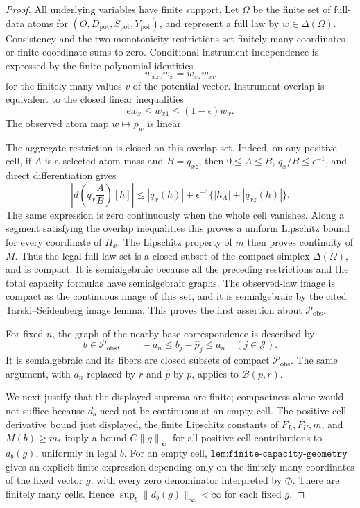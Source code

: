\documentclass{article}
\begin{document}
\begin{proof}
All underlying variables have finite support.  Let \(\Omega\) be the finite set of full-data atoms for \((O,D_{\mathrm{pot}},S_{\mathrm{pot}},Y_{\mathrm{pot}})\), and represent a full law by \(w\in\Delta(\Omega)\).  Consistency and the two monotonicity restrictions set finitely many coordinates or finite coordinate sums to zero.  Conditional instrument independence is expressed by the finite polynomial identities
\[
w_{xzv}w_x=w_{xz}w_{xv}
\]
for the finitely many values \(v\) of the potential vector.  Instrument overlap is equivalent to the closed linear inequalities
\[
\epsilon w_x\le w_{x1}\le(1-\epsilon)w_x.
\]
The observed atom map \(w\mapsto p_w\) is linear.

The aggregate restriction is closed on this overlap set.  Indeed, on any positive cell, if \(A\) is a selected atom mass and \(B=q_{xz}\), then \(0\le A\le B\), \(q_x/B\le\epsilon^{-1}\), and direct differentiation gives
\[
\left|d\left(q_x\frac{A}{B}\right)[h]\right|
\le |q_x(h)|+\epsilon^{-1}\{|h_A|+|q_{xz}(h)|\}.
\]
The same expression is zero continuously when the whole cell vanishes.  Along a segment satisfying the overlap inequalities this proves a uniform Lipschitz bound for every coordinate of \(H_x\).  The Lipschitz property of \(m\) then proves continuity of \(M\).  Thus the legal full-law set is a closed subset of the compact simplex \(\Delta(\Omega)\), and is compact.  It is semialgebraic because all the preceding restrictions and the total capacity formulas have semialgebraic graphs.  The observed-law image is compact as the continuous image of this set, and it is semialgebraic by the cited Tarski--Seidenberg image lemma.  This proves the first assertion about \(\mathcal P_{\mathrm{obs}}\).

For fixed \(n\), the graph of the nearby-base correspondence is described by
\[
b\in\mathcal P_{\mathrm{obs}},\qquad -a_n\le b_j-\widehat p_j\le a_n
\quad(j\in\mathcal J).
\]
It is semialgebraic and its fibers are closed subsets of compact \(\mathcal P_{\mathrm{obs}}\).  The same argument, with \(a_n\) replaced by \(r\) and \(\widehat p\) by \(p\), applies to \(\mathcal B(p,r)\).

We next justify that the displayed suprema are finite; compactness alone would not suffice because \(d_b\) need not be continuous at an empty cell.  The positive-cell derivative bound just displayed, the finite Lipschitz constants of \(F_L,F_U,m\), and \(M(b)\ge m_*\) imply a bound \(C\|g\|_\infty\) for all positive-cell contributions to \(d_b(g)\), uniformly in legal \(b\).  For an empty cell, \(\texttt{lem:finite-capacity-geometry}\) gives an explicit finite expression depending only on the finitely many coordinates of the fixed vector \(g\), with every zero denominator interpreted by \(\oslash\).  There are finitely many cells.  Hence \(\sup_b\|d_b(g)\|_\infty<\infty\) for each fixed \(g\).


\end{proof}
\end{document}

